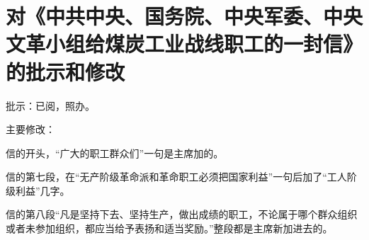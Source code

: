 \section[对《中共中央、国务院、中央军委、中央文革小组给煤炭工业战线职工的一封信》的批示和修改（一九六七年八月十六日）]{对《中共中央、国务院、中央军委、中央文革小组给煤炭工业战线职工的一封信》的批示和修改}


批示：已阅，照办。


主要修改：

信的开头，“广大的职工群众们”一句是主席加的。

信的第七段，在“无产阶级革命派和革命职工必须把国家利益”一句后加了“工人阶级利益”几字。

信的第八段“凡是坚持下去、坚持生产，做出成绩的职工，不论属于哪个群众组织或者未参加组织，都应当给予表扬和适当奖励。”整段都是主席新加进去的。


